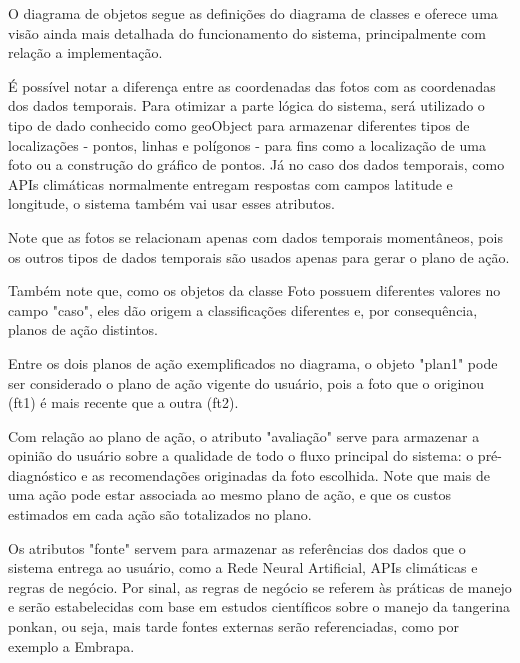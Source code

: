 \documentclass[
  a4paper,%
  12pt,%
  english,%
  brazilian,%
]{article}
\begin{document}
    O diagrama de objetos segue as definições do diagrama de classes e oferece uma visão ainda mais detalhada do funcionamento do sistema, principalmente com relação a implementação.

    É possível notar a diferença entre as coordenadas das fotos com as coordenadas dos dados temporais. Para otimizar a parte lógica do sistema, será utilizado o tipo de dado conhecido como geoObject para armazenar diferentes tipos de localizações - pontos, linhas e polígonos - para fins como a localização de uma foto ou a construção do gráfico de pontos. Já no caso dos dados temporais, como APIs climáticas normalmente entregam respostas com campos latitude e longitude, o sistema também vai usar esses atributos. 

    Note que as fotos se relacionam apenas com dados temporais momentâneos, pois os outros tipos de dados temporais são usados apenas para gerar o plano de ação.

    Também note que, como os objetos da classe Foto possuem diferentes valores no campo "caso", eles dão origem a classificações diferentes e, por consequência, planos de ação distintos.

    Entre os dois planos de ação exemplificados no diagrama, o objeto "plan1" pode ser considerado o plano de ação vigente do usuário, pois a foto que o originou (ft1) é mais recente que a outra (ft2).

    Com relação ao plano de ação, o atributo "avaliação" serve para armazenar a opinião do usuário sobre a qualidade de todo o fluxo principal do sistema: o pré-diagnóstico e as recomendações originadas da foto escolhida. Note que mais de uma ação pode estar associada ao mesmo plano de ação, e que os custos estimados em cada ação são totalizados no plano. 

    Os atributos "fonte" servem para armazenar as referências dos dados que o sistema entrega ao usuário, como a Rede Neural Artificial, APIs climáticas e regras de negócio. Por sinal, as regras de negócio se referem às práticas de manejo e serão estabelecidas com base em estudos científicos sobre o manejo da tangerina ponkan, ou seja, mais tarde fontes externas serão referenciadas, como por exemplo a Embrapa.  
\end{document}

